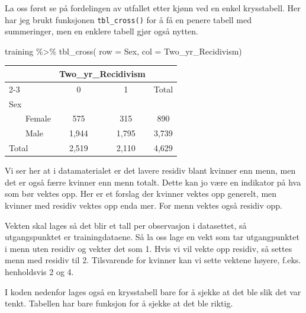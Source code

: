 \documentclass[
  letterpaper,
  DIV=11,
  numbers=noendperiod]{scrreprt}
\newenvironment{Shaded}{\begin{snugshade}}{\end{snugshade}}
\newcommand{\AttributeTok}[1]{\textcolor[rgb]{0.40,0.45,0.13}{#1}}
\newcommand{\FunctionTok}[1]{\textcolor[rgb]{0.28,0.35,0.67}{#1}}
\newcommand{\NormalTok}[1]{\textcolor[rgb]{0.00,0.23,0.31}{#1}}
\newcommand{\SpecialCharTok}[1]{\textcolor[rgb]{0.37,0.37,0.37}{#1}}
\begin{document}
La oss først se på fordelingen av utfallet etter kjønn ved en enkel
krysstabell. Her har jeg brukt funksjonen \texttt{tbl\_cross()} for å få
en penere tabell med summeringer, men en enklere tabell gjør også
nytten.

\begin{Shaded}
\begin{Highlighting}[]
\NormalTok{training }\SpecialCharTok{\%\textgreater{}\%} 
   \FunctionTok{tbl\_cross}\NormalTok{( }\AttributeTok{row =}\NormalTok{ Sex, }\AttributeTok{col =}\NormalTok{  Two\_yr\_Recidivism)}
\end{Highlighting}
\end{Shaded}

\begin{table}
\fontsize{12.0pt}{14.0pt}\selectfont
\begin{tabular*}{\linewidth}{@{\extracolsep{\fill}}lccc}
\toprule
 & \multicolumn{2}{c}{Two\_yr\_Recidivism} &  \\ 
\cmidrule(lr){2-3}
 & 0 & 1 & Total \\ 
\midrule\addlinespace[2.5pt]
Sex &  &  &  \\ 
    Female & 575 & 315 & 890 \\ 
    Male & 1,944 & 1,795 & 3,739 \\ 
Total & 2,519 & 2,110 & 4,629 \\ 
\bottomrule
\end{tabular*}
\end{table}

Vi ser her at i datamaterialet er det lavere residiv blant kvinner enn
menn, men det er også færre kvinner enn menn totalt. Dette kan jo være
en indikator på hva som bør vektes opp. Her er et forslag der kvinner
vektes opp generelt, men kvinner med residiv vektes opp enda mer. For
menn vektes også residiv opp.

Vekten skal lages så det blir et tall per observasjon i datasettet, så
utgangspunktet er trainingdataene. Så la oss lage en vekt som tar
utgangpunktet i menn uten residiv og vekter det som 1. Hvis vi vil vekte
opp residiv, så settes menn med residiv til 2. Tilsvarende for kvinner
kan vi sette vektene høyere, f.eks. henholdsvis 2 og 4.

I koden nedenfor lages også en krysstabell bare for å sjekke at det ble
slik det var tenkt. Tabellen har bare funksjon for å sjekke at det ble
riktig.
\end{document}
